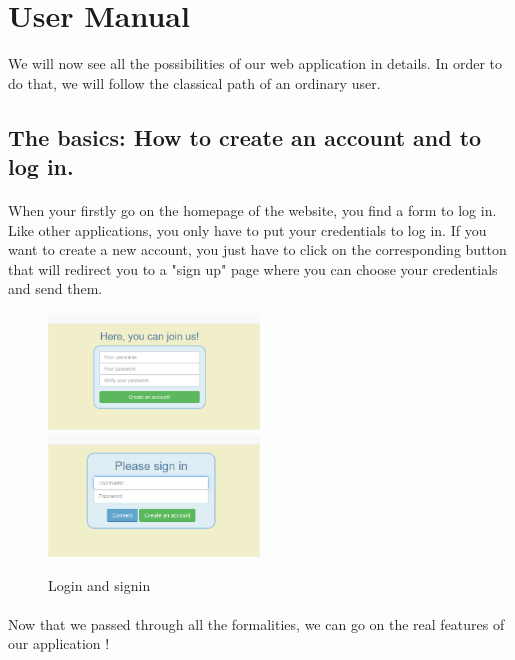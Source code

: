 \section{User Manual}

We will now see all the possibilities of our web application in details. In order to do that, we will follow the classical path of an ordinary user.

\subsection{The basics: How to create an account and to log in.}

\paragraph{}
When your firstly go on the homepage of the website, you find a form to log in. Like other applications, you only have to put your credentials to log in. If you want to create a new account, you just have to click on the corresponding button that will redirect you to a "sign up" page where you can choose your credentials and send them.

\begin{figure}[H]
    \includegraphics[width=0.5\textwidth]{./images/signin.png}
    \includegraphics[width=0.5\textwidth]{./images/login.png}
    \caption{Login and signin}
\end{figure}

\paragraph{}
Now that we passed through all the formalities, we can go on the real features of our application !

